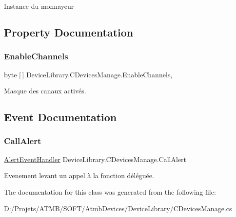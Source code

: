 Instance du monnayeur 



\subsection{Property Documentation}
\mbox{\label{class_device_library_1_1_c_devices_manage_a881da4fa7a164664f6342669ca532b7b}} 
\subsubsection{\texorpdfstring{Enable\+Channels}{EnableChannels}}
{\footnotesize\ttfamily byte \mbox{[}$\,$\mbox{]} Device\+Library.\+C\+Devices\+Manage.\+Enable\+Channels\hspace{0.3cm}{\ttfamily [static]}, {\ttfamily [get]}}



Masque des canaux activés. 



\subsection{Event Documentation}
\mbox{\label{class_device_library_1_1_c_devices_manage_a6813f81d6f606f0aa66fb6613af6bbe8}} 
\subsubsection{\texorpdfstring{Call\+Alert}{CallAlert}}
{\footnotesize\ttfamily \mbox{\hyperlink{class_device_library_1_1_c_devices_manage_a76f84b8a18500338f67d33123aa3332a}{Alert\+Event\+Handler}} Device\+Library.\+C\+Devices\+Manage.\+Call\+Alert}



Evenement levant un appel à la fonction déléguée. 



The documentation for this class was generated from the following file\+:\begin{DoxyCompactItemize}
\item 
D\+:/\+Projets/\+A\+T\+M\+B/\+S\+O\+F\+T/\+Atmb\+Devices/\+Device\+Library/C\+Devices\+Manage.\+cs\end{DoxyCompactItemize}
